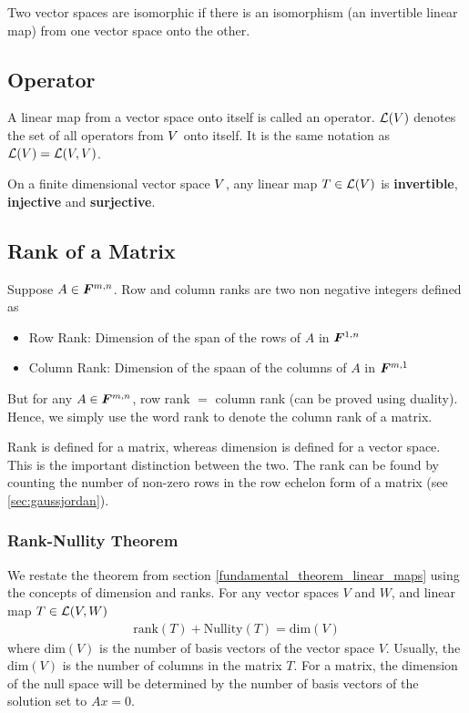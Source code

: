 \documentclass[../../linear_algebra.tex]{subfiles}
\begin{document}
Two vector spaces are isomorphic if there is an isomorphism (an invertible linear map) from one vector space onto the other.


\subsection{Operator}
A linear map from a vector space onto itself is called an operator. $\mathcal{L}(V)$ denotes the set of all operators from $V$ onto itself. It is the same notation as $\mathcal{L}(V) = \mathcal{L}(V, V)$.\newline

On a finite dimensional vector space $V$, any linear map $T \in \mathcal{L}(V)$ is \textbf{invertible}, \textbf{injective} and \textbf{surjective}.

\subsection{Rank of a Matrix}
Suppose $A \in \bm{F}^{m, n}$. Row and column ranks are two non negative integers defined as
\begin{itemize}
    \item Row Rank: Dimension of the span of the rows of $A$ in $\bm{F}^{1, n}$
    \item Column Rank: Dimension of the spaan of the columns of $A$ in $\bm{F}^{m, 1}$
\end{itemize}
But for any $A \in \bm{F}^{m, n}$, row rank $=$ column rank (can be proved using duality). Hence, we simply use the word rank to denote the column rank of a matrix.\newline

Rank is defined for a matrix, whereas dimension is defined for a vector space. This is the important distinction between the two. The rank can be found by counting the number of non-zero rows in the row echelon form of a matrix (see \ref{sec:gaussjordan}).

\subsubsection{Rank-Nullity Theorem}\label{rank_nullity_theorem}
We restate the theorem from section \ref{fundamental_theorem_linear_maps} using the concepts of dimension and ranks. For any vector spaces $V$ and $W$, and linear map $T \in \mathcal{L}(V, W)$
\begin{align*}
    \text{rank}(T) + \text{Nullity}(T) = \text{dim}(V)
\end{align*}
where dim$(V)$ is the number of basis vectors of the vector space $V$. Usually, the dim$(V)$ is the number of columns in the matrix $T$. For a matrix, the dimension of the null space will be determined by the number of basis vectors of the solution set to $Ax=0$.
\end{document}
